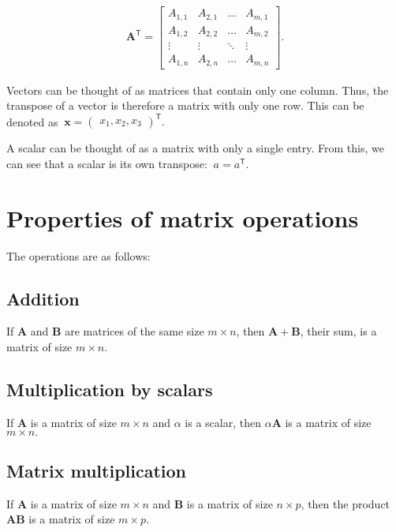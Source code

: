 \documentclass[12pt]{article}
\begin{document}
\begin{align}
\mathbf{A}^{\mathsf{T}} = \begin{bmatrix} {A}_{1,1} & {A}_{2,1} & \ldots & {A}_{m,1}\\ {A}_{1,2} & {A}_{2,2} & \ldots & {A}_{m,2} \\ \vdots & \vdots & \ddots & \vdots \\ {A}_{1,n} & {A}_{2,n} & \ldots & {A}_{m,n}\end{bmatrix}.
\end{align}

Vectors can be thought of as matrices that contain only one column. Thus, the transpose of a vector is therefore a matrix with only one row. This can be denoted as $\ \mathbf{x} = {\begin{pmatrix}x_{1},x_{2},x_{3}\end{pmatrix}}^{\mathsf{T}}.$

A scalar can be thought of as a matrix with only a single entry. From this, we can see that a scalar is its own transpose: $\ a = a^{\mathsf{T}}.$

\section{Properties of matrix operations}

The operations are as follows:

\subsection{Addition}

If $\mathbf{A}$ and $\mathbf{B}$ are matrices of the same size $m\times n$, then $\mathbf{A} + \mathbf{B}$,
their sum, is a matrix of size $m\times n.$

\subsection{Multiplication by scalars}

If $\mathbf{A}$ is a matrix of size $m\times n$ and $\alpha$ is a scalar,
then $\alpha\mathbf{A}$ is a matrix of size $m\times n.$

\subsection{Matrix multiplication}

If $\mathbf{A}$ is a matrix of size $m\times n$ and $\mathbf{B}$ is a matrix of size $n\times p$, then the product $\mathbf{AB}$ is a matrix of size $m\times p.$
\end{document}

